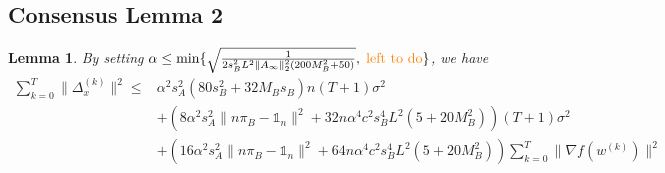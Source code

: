 \documentclass{article}
\newtheorem{lemma}[thm]{Lemma}
\newcommand{\norm}[1]{\| #1 \|}
\newcommand{\one}{\mathds{1}_n}
\begin{document}
\subsection{Consensus Lemma 2}
\begin{lemma}
  By setting $\alpha \leq \min\{\sqrt{\frac{1}{2s_B^2L^2\norm{A_{\infty}}_2^2(200M_B^2+50)}},\; \textcolor{orange}{\text{left to do}}\} $, we have
  \begin{align*}
    \sum_{k=0}^T\norm{\Delta_x^{(k)}}^2
  \leq &\alpha^2s_A^2(80s_B^2+32M_Bs_B)n (T+1)\sigma^2\\&+\left(8\alpha^2s_A^2\norm{n\pi_B-\one}^2+32n\alpha^4c^2s_B^4L^2(5+20M_B^2)\right)(T+1)\sigma^2\\&+\left(16\alpha^2s_A^2\norm{n\pi_B-\one}^2+64n\alpha^4c^2s_B^4L^2(5+20M_B^2)\right) \sum_{k=0}^T\norm{\nabla f(w^{(k)})}^2
  \end{align*}
\end{lemma}
\end{document}
